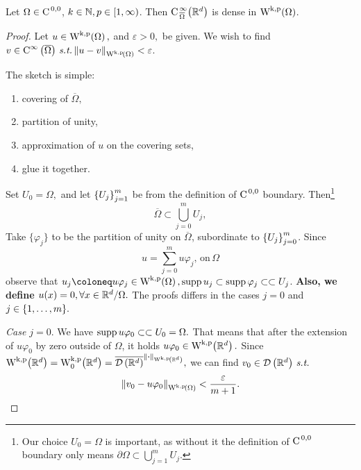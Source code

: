 \documentclass{article}
\begin{document}
\begin{theorem}
	Let $\Omega \in \text{C}^{\!\,\, 0,0}$, $k \in {\mathbb N}, p \in [1,\infty)$. Then $\text{C}^{\,\infty}_{\,\overline{\Omega}}\qty({\mathbb R}^d)$ is dense in $\WkpSet{\Omega}$.


\end{theorem}

\begin{proof}
	Let $u \in \WkpSet{\Omega},$ and $\varepsilon >0,$ be given. We wish  to find $v \in \CinfSet{\overline{\Omega}}\, \text{\textit{s.t.}} \,  \norm{u-v}_{\WkpSet{\Omega}} < \varepsilon$.

	The sketch is simple:  
	\begin{enumerate}
		\item covering of $\overline{\Omega},$
		\item partition of unity,
		\item approximation of $u$ on the covering sets,
		\item glue it together.
	\end{enumerate}

	Set $U_0 = \Omega,$ and let $\qty{U_j}_{j=1}^m$ be from the definition of $\text{C}^{\!\,\, 0,0}$ boundary. Then\footnote{Our choice $U_0 = \Omega$ is important, as without it the definition of $\text{C}^{\!\,\, 0,0}$ boundary only means $\partial \Omega \subset \bigcup_{j=1}^m U_j.$}
	\[
		\overline{\Omega} \subset \bigcup_{j=0}^m U_j,
	\]
	Take $\{\varphi_j\}$ to be the partition of unity on $\overline{\Omega}$, subordinate to $\qty{U_j}_{j=0}^m$. Since
	\[
		u = \sum_{j=0}^m u \varphi_j, \, \text{on} \, \Omega
	\]
	observe that $u_j \coloneq u \varphi_j \in \WkpSet{\Omega}, \supp u_j \subset \supp \varphi_j \subset \subset U_j$. \textbf{Also, we define $u(x) = 0, \forall x \in {\mathbb R}^{d}/\Omega.$} 
	The proofs differs in the cases $j = 0$ and $j \in \qty{1, \dots, m}.$

	\textit{Case $j=0$}.
	We have $ \operatorname{supp} u \varphi_0 \subset \subset U_0 = \Omega.$ That means that after the extension of $u \varphi_0$ by zero outside of $\Omega$, it holds $u \varphi_0 \in \WkpSet{\R^d}.$ Since $\WkpSet{\R^d} = \WkpzeroSet{\R^d} = \overline{\DSet{\R^{d}}}^{\norm{\vdot}_{\WkpSet{\R^{d}}}},$ we can find $v_0 \in \mathcal{D}\!\,\left({\mathbb R}^{d} \right) \, \text{\textit{s.t.}} \,$
	\[
		\norm{v_0 - u \varphi_0}_{\WkpSet{\Omega}} < \frac{\varepsilon}{m+1}.
	\]


\end{proof}
\end{document}
